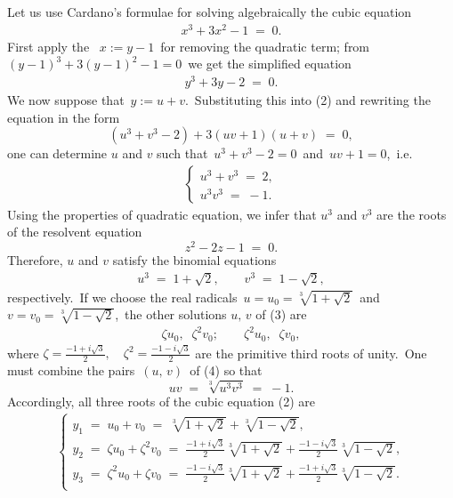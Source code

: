 \documentclass[12pt]{article}
\theoremstyle{definition}
\begin{document}
Let us use Cardano's formulae for solving algebraically the cubic equation 
\begin{align}
x^3\!+\!3x^2\!-\!1 \;=\; 0.
\end{align}
First apply the \, $x := y\!-\!1$\, for removing the quadratic term; from\, $(y-1)^3+3(y-1)^2-1 = 0$\, we get the simplified equation
\begin{align}
y^3\!+\!3y\!-\!2 \;=\; 0.
\end{align}
We now suppose that\, $y := u\!+\!v$.\, Substituting this into (2) and rewriting the equation in the form
$$(u^3\!+\!v^3\!-\!2)+3(uv\!+\!1)(u\!+\!v) \;=\; 0,$$
one can determine $u$ and $v$ such that\, $u^3\!+\!v^3\!-\!2 = 0$\, and\, $uv\!+\!1 = 0$,\, i.e. 
\begin{align*}
\begin{cases}
u^3\!+\!v^3 \;=\; 2,\\
u^3v^3 \;=\; -1.
\end{cases}
\end{align*}
Using the properties of quadratic equation, we infer that $u^3$ and $v^3$ are the roots of the resolvent equation
$$z^2\!-\!2z\!-\!1 \;=\; 0.$$
Therefore, $u$ and $v$ satisfy the binomial equations
\begin{align}
u^3 \;=\; 1\!+\!\sqrt{2}, \qquad v^3 \;=\; 1\!-\!\sqrt{2},
\end{align}
respectively.\, If we choose the real radicals \,$u = u_0 = \sqrt[3]{1\!+\!\sqrt{2}}$\, and\, 
$v = v_0 = \sqrt[3]{1\!-\!\sqrt{2}}$,\, the other solutions $u,\,v$ of (3) are
\begin{align}
\zeta u_0,\;\;\zeta^2v_0; \qquad \zeta^2u_0,\;\;\zeta v_0,
\end{align}
where\; $\zeta = \frac{-1+i\sqrt{3}}{2}, 
\quad \zeta^2 = \frac{-1-i\sqrt{3}}{2}$\;
are the primitive third roots of unity.\,  One must combine the pairs\, $(u,\,v)$\, of (4) so that
$$uv \;=\; \sqrt[3]{u^3v^3} \;=\; -1.$$
Accordingly, all three roots of the cubic equation (2) are
\begin{align*}
\begin{cases}
y_1 \;=\; u_0\!+\!v_0 \;=\; \sqrt[3]{1\!+\!\sqrt{2}}\!+\!\sqrt[3]{1\!-\!\sqrt{2}},\\ 
y_2 \;=\; \zeta u_0\!+\!\zeta^2v_0 \;=\;  
  \frac{-1+i\sqrt{3}}{2}\sqrt[3]{1\!+\!\sqrt{2}}\!+\!\frac{-1-i\sqrt{3}}{2}\sqrt[3]{1\!-\!\sqrt{2}},\\
y_3 \;=\; \zeta^2u_0\!+\!\zeta v_0 \;=\;  
  \frac{-1-i\sqrt{3}}{2}\sqrt[3]{1\!+\!\sqrt{2}}\!+\!\frac{-1+i\sqrt{3}}{2}\sqrt[3]{1\!-\!\sqrt{2}}.\\
\end{cases}
\end{align*}
\end{document}
